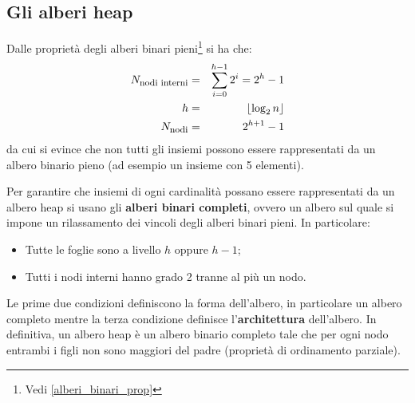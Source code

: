 \subsection{Gli alberi heap}
Dalle proprietà degli alberi binari pieni\footnote{Vedi \ref{alberi_binari_prop}} si ha che:
\begin{eqnarray}
	N_{\mbox{{\footnotesize nodi interni}}}&=& \sum_{i=0}^{h-1} 2^{i}= 2^{h}-1\\
	h&=&\lfloor \log_{2}n\rfloor \label{altezzaheap} \\
	N_{\mbox{{\footnotesize nodi}}}&=& 2^{h+1}-1 \label{eq:noditree}
\end{eqnarray}
da cui si evince che non tutti gli insiemi possono essere rappresentati da un albero binario pieno (ad esempio un insieme con 5 elementi).

Per garantire che insiemi di ogni cardinalità possano essere rappresentati da un albero heap si usano gli \textbf{alberi binari completi}, ovvero un albero sul quale si impone un rilassamento dei vincoli degli alberi binari pieni. In particolare:
\begin{itemize}
	\item Tutte le foglie sono a livello $h$ oppure $h-1$;
	\item Tutti i nodi interni hanno grado 2 tranne al più un nodo.
\end{itemize}



\begin{osservation}
	Le prime due condizioni definiscono la forma dell'albero, in particolare un albero completo  mentre la terza condizione definisce l'\textbf{architettura} dell'albero. In definitiva, un albero heap è un albero binario completo tale che per ogni nodo entrambi i figli non sono maggiori del padre (proprietà di ordinamento parziale). 
\end{osservation}

\begin{center}
	\label{fig:heap}
\end{center}

